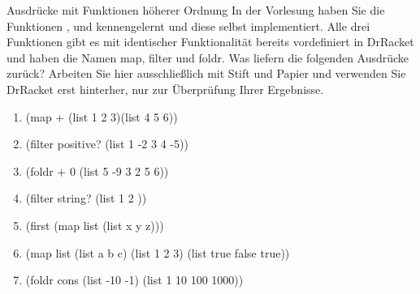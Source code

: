 \documentclass{../preamble}
\begin{document}
\begin{task}[credit = \stars{1}{3}]{Ausdrücke mit Funktionen höherer Ordnung}
    In der Vorlesung haben Sie die Funktionen ,  und  kennengelernt und diese selbst implementiert. Alle drei Funktionen gibt es mit identischer Funktionalität bereits vordefiniert in DrRacket und haben die Namen
    \textcolor{keywordcolor}{map}, \textcolor{keywordcolor}{filter} und \textcolor{keywordcolor}{foldr}.
    \br
    Was liefern die folgenden Ausdrücke zurück? Arbeiten Sie hier ausschließlich mit Stift und Papier und verwenden Sie DrRacket erst hinterher, nur zur Überprüfung Ihrer Ergebnisse.
    \begin{enumerate}
        \item (\textcolor{keywordcolor}{map} + (\textcolor{keywordcolor}{list} 1 2 3)(\textcolor{keywordcolor}{list} 4 5 6))
        \item (\textcolor{keywordcolor}{filter} \textcolor{keywordcolor}{positive?} (\textcolor{keywordcolor}{list} 1 -2 3 4 -5))
        \item (\textcolor{keywordcolor}{foldr} + 0 (\textcolor{keywordcolor}{list} 5 -9 3 2 5 6))
        \item (\textcolor{keywordcolor}{filter} \textcolor{keywordcolor}{string?} (\textcolor{keywordcolor}{list} 1 2 \grqq{} \grqq))
        \item (\textcolor{keywordcolor}{first} (\textcolor{keywordcolor}{map} \textcolor{keywordcolor}{list} (\textcolor{keywordcolor}{list} \grqq x\grqq{} \grqq y\grqq{} \grqq z\grqq)))
        \item (\textcolor{keywordcolor}{map} \textcolor{keywordcolor}{list} (\textcolor{keywordcolor}{list}  \grqq a\grqq{}  \grqq b\grqq{}  \grqq c\grqq) (\textcolor{keywordcolor}{list} 1 2 3) (\textcolor{keywordcolor}{list} \textcolor{keywordcolor}{true} \textcolor{keywordcolor}{false} \textcolor{keywordcolor}{true}))
        \item (\textcolor{keywordcolor}{foldr} \textcolor{keywordcolor}{cons} (\textcolor{keywordcolor}{list} -10 -1) (\textcolor{keywordcolor}{list} 1 10 100 1000))
    \end{enumerate}


\end{task}
\end{document}
